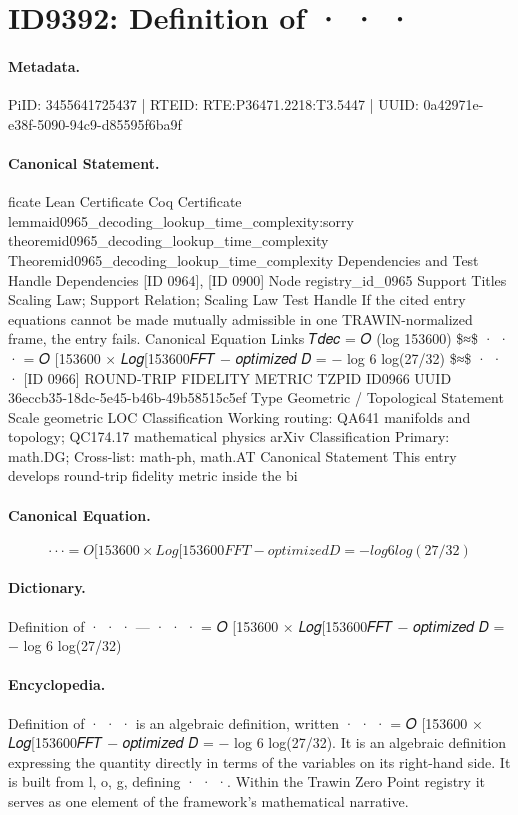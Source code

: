 \section*{ID9392: Definition of · · ·}
\paragraph{Metadata.}
PiID: 3455641725437 | RTEID: RTE:P36471.2218:T3.5447 | UUID: 0a42971e-e38f-5090-94c9-d85595f6ba9f

\paragraph{Canonical Statement.}
ficate Lean Certificate Coq Certificate lemmaid0965\_decoding\_lookup\_time\_complexity:sorry theoremid0965\_decoding\_lookup\_time\_complexity Theoremid0965\_decoding\_lookup\_time\_complexity Dependencies and Test Handle Dependencies [ID 0964], [ID 0900] Node registry\_id\_0965 Support Titles Scaling Law; Support Relation; Scaling Law Test Handle If the cited entry equations cannot be made mutually admissible in one TRAWIN-normalized frame, the entry fails. Canonical Equation Links 𝑇𝑑𝑒𝑐 = 𝑂 (log 153600) \$≈\$ · · · = 𝑂 [153600 × 𝐿𝑜𝑔[153600𝐹𝐹𝑇 − 𝑜𝑝𝑡𝑖𝑚𝑖𝑧𝑒𝑑 𝐷 = − log 6 log(27/32) \$≈\$ · · · [ID 0966] ROUND-TRIP FIDELITY METRIC TZPID ID0966 UUID 36eccb35-18dc-5e45-b46b-49b58515c5ef Type Geometric / Topological Statement Scale geometric LOC Classification Working routing: QA641 manifolds and topology; QC174.17 mathematical physics arXiv Classification Primary: math.DG; Cross-list: math-ph, math.AT Canonical Statement This entry develops round-trip fidelity metric inside the bi

\paragraph{Canonical Equation.}
\[
· · · = 𝑂 [153600 × 𝐿𝑜𝑔[153600𝐹𝐹𝑇 − 𝑜𝑝𝑡𝑖𝑚𝑖𝑧𝑒𝑑 𝐷 = − log 6 log(27/32)
\]

\paragraph{Dictionary.}
Definition of · · · — · · · = 𝑂 [153600 × 𝐿𝑜𝑔[153600𝐹𝐹𝑇 − 𝑜𝑝𝑡𝑖𝑚𝑖𝑧𝑒𝑑 𝐷 = − log 6 log(27/32)

\paragraph{Encyclopedia.}
Definition of · · · is an algebraic definition, written · · · = 𝑂 [153600 × 𝐿𝑜𝑔[153600𝐹𝐹𝑇 − 𝑜𝑝𝑡𝑖𝑚𝑖𝑧𝑒𝑑 𝐷 = − log 6 log(27/32). It is an algebraic definition expressing the quantity directly in terms of the variables on its right-hand side. It is built from l, o, g, defining · · ·. Within the Trawin Zero Point registry it serves as one element of the framework's mathematical narrative.
